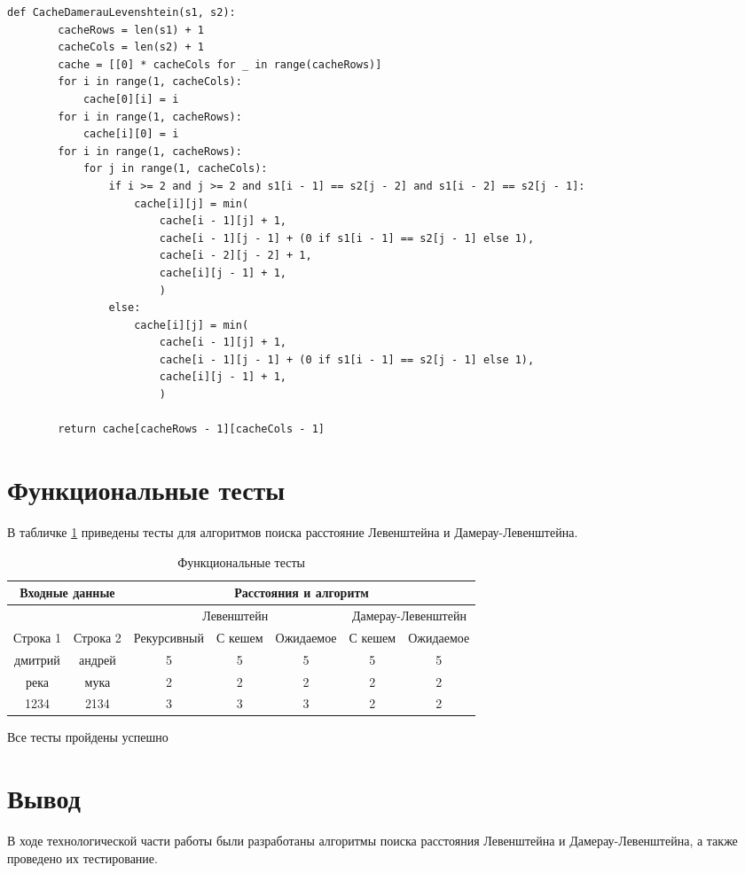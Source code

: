 \begin{lstlisting}[label=cache-damerau-levenshtein,caption={Итерационный алгоритм нахождения расстояния Дамерау-Левенштейна с кешэм}]
	def CacheDamerauLevenshtein(s1, s2):
		cacheRows = len(s1) + 1
		cacheCols = len(s2) + 1
		cache = [[0] * cacheCols for _ in range(cacheRows)]
		for i in range(1, cacheCols):
			cache[0][i] = i
		for i in range(1, cacheRows):
			cache[i][0] = i
		for i in range(1, cacheRows):
			for j in range(1, cacheCols):
				if i >= 2 and j >= 2 and s1[i - 1] == s2[j - 2] and s1[i - 2] == s2[j - 1]:
					cache[i][j] = min(
						cache[i - 1][j] + 1,
						cache[i - 1][j - 1] + (0 if s1[i - 1] == s2[j - 1] else 1),
						cache[i - 2][j - 2] + 1,
						cache[i][j - 1] + 1,
						)
				else:
					cache[i][j] = min(
						cache[i - 1][j] + 1,
						cache[i - 1][j - 1] + (0 if s1[i - 1] == s2[j - 1] else 1),
						cache[i][j - 1] + 1,
						)
		
		return cache[cacheRows - 1][cacheCols - 1]
\end{lstlisting}

\section{Функциональные тесты}

В табличке \ref{tbl:func_tests} приведены тесты для алгоритмов поиска расстояние Левенштейна и Дамерау-Левенштейна.

\begin{table}[ht]
	\small
	\begin{center}
		\begin{threeparttable}
			\caption{Функциональные тесты}
			\label{tbl:func_tests}
			\begin{tabular}{|c|c|c|c|c|c|c|}
				\hline
				\multicolumn{2}{|c|}{\bfseries Входные данные}
				& \multicolumn{5}{c|}{\bfseries Расстояния и алгоритм} \\ 
				\hline
				&
				&
				\multicolumn{3}{c|}{Левенштейн} & \multicolumn{2}{c|}{Дамерау-Левенштейн} \\ \cline{3-7}
				Строка 1 & Строка 2 & Рекурсивный & С кешем &  Ожидаемое & С кешем & Ожидаемое \\
				\hline
				дмитрий & андрей & 5 & 5 & 5 & 5 & 5 \\
				\hline
				река & мука & 2 & 2 & 2 & 2 & 2 \\
				\hline
				1234 & 2134 & 3 & 3 & 3 & 2 & 2 \\
				\hline
			\end{tabular}	
		\end{threeparttable}
	\end{center}
\end{table}

Все тесты пройдены успешно

\section*{Вывод}

В ходе технологической части работы были разработаны алгоритмы поиска расстояния Левенштейна и Дамерау-Левенштейна, а также проведено их тестирование.

\clearpage
